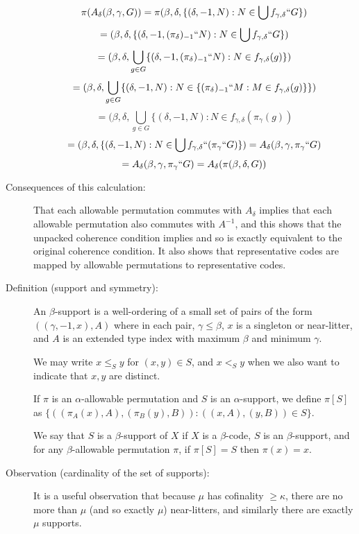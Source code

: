 \documentclass[112pt]{article}
\begin{document}
\begin{description}
$$\pi(A_\delta(\beta,\gamma,G)) = \pi(\beta,\delta,\{(\delta,-1,N):N \in \bigcup f_{\gamma,\delta}``G\})$$ $$ = (\beta,\delta,\{(\delta,-1,(\pi_\delta)_{-1}``N):N \in \bigcup f_{\gamma,\delta}``G\})  $$ $$ =(\beta,\delta,\bigcup_{g \in G} \{(\delta,-1,(\pi_\delta)_{-1}``N):N\in f_{\gamma,\delta}(g)\}) $$ $$ = (\beta,\delta,\bigcup_{g \in G}\{(\delta,-1,N):N \in \{(\pi_{\delta})_{-1}``M:M \in f_{\gamma,\delta}(g)\}\}) $$ $$ = (\beta,\delta,\bigcup_{g \in G}\{(\delta,-1,N):N \in f_{\gamma,\delta}(\pi_\gamma(g))$$ $$ =(\beta,\delta,\{(\delta,-1,N):N \in \bigcup f_{\gamma,\delta}``(\pi_\gamma``G)\})= A_\delta(\beta,\gamma,\pi_\gamma``G) $$ $$= A_\delta(\beta,\gamma,\pi_\gamma``G) = A_\delta(\pi(\beta,\delta,G))$$

\item[Consequences of this calculation:]

That each allowable permutation commutes with $A_\delta$ implies that each allowable permutation also commutes with $A^{-1}$, and this shows
that the unpacked coherence condition implies and so is exactly equivalent to the original coherence condition.  It also shows that representative codes
are mapped by allowable permutations to representative codes.



\item[Definition (support and symmetry):]  An $\beta$-support is a well-ordering of a small set of pairs of the form $((\gamma,-1,x),A)$
where in each pair, $\gamma\leq \beta$, $x$ is a singleton or near-litter, and $A$ is an extended type index with maximum $\beta$ and minimum $\gamma$.

We may write $x \leq_S y$ for $(x,y) \in S$, and $x <_S y$ when we also want to indicate that $x,y$ are distinct.

If $\pi$ is an $\alpha$-allowable permutation and $S$ is an $\alpha$-support, we define $\pi[S]$ as $\{((\pi_A(x),A),(\pi_B(y),B)):((x,A),(y,B))\in S\}$.

We say that $S$ is a $\beta$-support of $X$ if $X$ is a $\beta$-code, $S$ is an $\beta$-support, and for any $\beta$-allowable permutation $\pi$, if $\pi[S]=S$ then $\pi(x)=x$.

\item[Observation (cardinality of the set of supports):]  It is a useful observation that because $\mu$ has cofinality $\geq \kappa$, there are no more than $\mu$ (and so exactly $\mu$) near-litters,
and similarly there are exactly $\mu$ supports.


\end{description}
\end{document}
